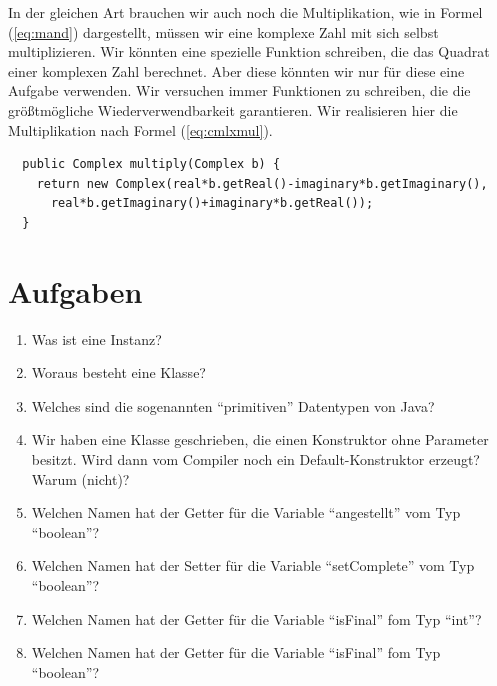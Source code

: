 In der gleichen Art brauchen wir auch noch die Multiplikation, wie in Formel (\ref{eq:mand}) dargestellt, müssen wir eine komplexe Zahl mit sich selbst multiplizieren. Wir könnten eine spezielle Funktion schreiben, die das Quadrat einer komplexen Zahl berechnet. Aber diese könnten wir nur für diese eine Aufgabe verwenden. Wir versuchen immer Funktionen zu schreiben, die die größtmögliche Wiederverwendbarkeit garantieren. Wir realisieren hier die Multiplikation nach Formel (\ref{eq:cmlxmul}). 

\begin{lstlisting}
  public Complex multiply(Complex b) {
    return new Complex(real*b.getReal()-imaginary*b.getImaginary(),
      real*b.getImaginary()+imaginary*b.getReal());
  }
\end{lstlisting}

\section{Aufgaben}
\begin{enumerate}
\item Was ist eine Instanz?
\item Woraus besteht eine Klasse?
\item Welches sind die sogenannten "`primitiven"' Datentypen von Java?
\item Wir haben eine Klasse geschrieben, die einen Konstruktor ohne Parameter besitzt. Wird dann vom Compiler noch ein Default-Konstruktor erzeugt? Warum (nicht)?
\item Welchen Namen hat der Getter für die Variable "`angestellt"' vom Typ "`boolean"'?
\item Welchen Namen hat der Setter für die Variable "`setComplete"' vom Typ "`boolean"'?
\item Welchen Namen hat der Getter für die Variable "`isFinal"' fom Typ "`int"'?
\item Welchen Namen hat der Getter für die Variable "`isFinal"' fom Typ "`boolean"'?
\end{enumerate}



